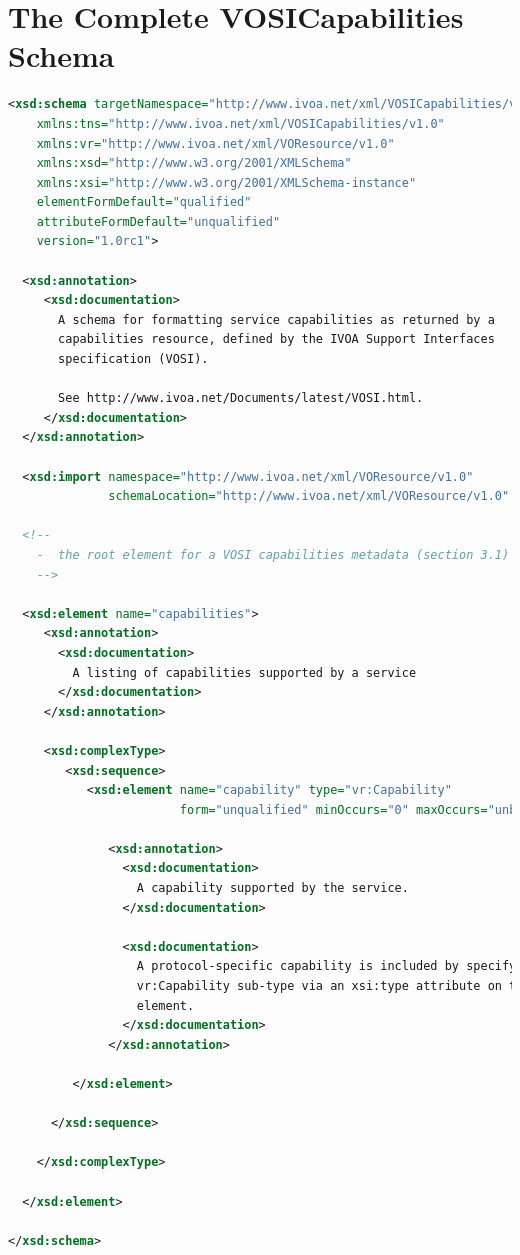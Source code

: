 \documentclass[11pt,letter]{ivoa}
\begin{document}
\appendix

\section{The Complete VOSICapabilities Schema}
\begin{lstlisting}[language=XML]
<xsd:schema targetNamespace="http://www.ivoa.net/xml/VOSICapabilities/v1.0"
    xmlns:tns="http://www.ivoa.net/xml/VOSICapabilities/v1.0"
    xmlns:vr="http://www.ivoa.net/xml/VOResource/v1.0"
    xmlns:xsd="http://www.w3.org/2001/XMLSchema"
    xmlns:xsi="http://www.w3.org/2001/XMLSchema-instance"
    elementFormDefault="qualified"
    attributeFormDefault="unqualified"
    version="1.0rc1">

  <xsd:annotation>
     <xsd:documentation>
       A schema for formatting service capabilities as returned by a 
       capabilities resource, defined by the IVOA Support Interfaces 
       specification (VOSI). 

       See http://www.ivoa.net/Documents/latest/VOSI.html.  
     </xsd:documentation>
  </xsd:annotation>

  <xsd:import namespace="http://www.ivoa.net/xml/VOResource/v1.0"
              schemaLocation="http://www.ivoa.net/xml/VOResource/v1.0" />

  <!--
    -  the root element for a VOSI capabilities metadata (section 3.1)
    -->

  <xsd:element name="capabilities">
     <xsd:annotation>
       <xsd:documentation>
         A listing of capabilities supported by a service
       </xsd:documentation>
     </xsd:annotation>

     <xsd:complexType>
        <xsd:sequence>
           <xsd:element name="capability" type="vr:Capability" 
                        form="unqualified" minOccurs="0" maxOccurs="unbounded">

              <xsd:annotation>
                <xsd:documentation>
                  A capability supported by the service.  
                </xsd:documentation>

                <xsd:documentation>
                  A protocol-specific capability is included by specifying a
                  vr:Capability sub-type via an xsi:type attribute on this 
                  element.
                </xsd:documentation>
              </xsd:annotation>

         </xsd:element>

      </xsd:sequence>

    </xsd:complexType>

  </xsd:element>

</xsd:schema>
\end{lstlisting}
\end{document}
